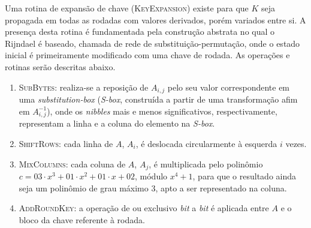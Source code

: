 \documentclass{ufsctex/ufsctex}
\begin{document}
Uma rotina de expansão de chave (\textsc{KeyExpansion}) existe para que $K$
seja propagada em todas as rodadas com valores derivados, porém variados entre
si. A presença desta rotina é fundamentada pela construção abstrata no qual o
Rijndael é baseado, chamada de rede de substituição-permutação, onde o estado
inicial é primeiramente modificado com uma chave de rodada. As operações e
rotinas serão descritas abaixo.

\begin{enumerate}[label=\roman*.]

  \item \textsc{SubBytes}: realiza-se a reposição de $A_{i, j}$ pelo seu valor
      correspondente em uma \emph{substitution-box} (\emph{S-box}, construída a
        partir de uma transformação afim em $A_{i, j}^{-1}$), onde os
        \emph{nibbles} mais e menos significativos, respectivamente,
        representam a linha e a coluna do elemento na \emph{S-box}.

  \item \textsc{ShiftRows}: cada linha de $A$, $A_i$, é deslocada circularmente
      à esquerda $i$ vezes.

  \item \textsc{MixColumns}: cada coluna de $A$, $A_j$, é multiplicada pelo
      polinômio $c = 03 \cdot x^{3} + 01 \cdot x^{2} + 01 \cdot x + 02$, módulo
        $x^{4} + 1$, para que o resultado ainda seja um polinômio de grau
        máximo 3, apto a ser representado na coluna.

  \item \textsc{AddRoundKey}: a operação de ou exclusivo \emph{bit} a
      \emph{bit} é aplicada entre $A$ e o bloco da chave referente à rodada.


\end{enumerate}
\end{document}
